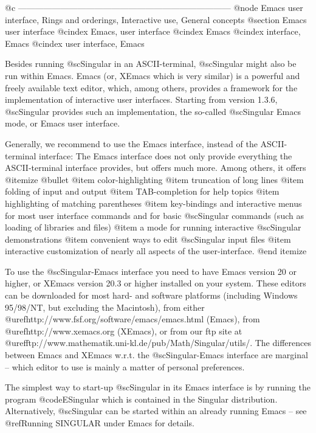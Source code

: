 @c ---------------------------------------------------------------------------
@node Emacs user interface, Rings and orderings, Interactive use, General concepts
@section Emacs user interface
@cindex Emacs, user interface
@cindex Emacs
@cindex interface, Emacs
@cindex user interface, Emacs

Besides running @sc{Singular} in an ASCII-terminal, @sc{Singular} might
also be run within Emacs. Emacs (or, XEmacs which is very similar) is a
powerful and freely available text editor, which, among others,
provides a framework for the implementation of interactive user
interfaces. Starting from version 1.3.6, @sc{Singular} provides such an
implementation, the so-called @sc{Singular} Emacs mode, or Emacs user
interface.

Generally, we recommend to use the Emacs interface,
instead of the ASCII-terminal interface: The Emacs interface does not
only provide everything the ASCII-terminal interface provides, but
offers much more. Among others, it offers
@itemize @bullet
@item
color-highlighting
@item
truncation of long lines
@item
folding of input and output
@item
TAB-completion for help topics
@item
highlighting of matching parentheses
@item
key-bindings and interactive menus for most user interface commands and
for basic @sc{Singular} commands (such as loading of libraries and files)
@item
a mode for running interactive @sc{Singular} demonstrations
@item
convenient ways to edit @sc{Singular} input files
@item
interactive customization of nearly all aspects of the user-interface.
@end itemize

To use the @sc{Singular}-Emacs interface you need to have Emacs version
20 or higher, or XEmacs
version 20.3 or higher installed on your system. These
editors can be downloaded for most hard- and software platforms
(including Windows
95/98/NT, but excluding the Macintosh), from either
@uref{http://www.fsf.org/software/emacs/emacs.html} (Emacs), from
@uref{http://www.xemacs.org} (XEmacs), or from our ftp site at
@uref{ftp://www.mathematik.uni-kl.de/pub/Math/Singular/utils/}. The
differences between Emacs and XEmacs w.r.t. the  @sc{Singular}-Emacs
interface are marginal -- which editor to use is mainly a matter of personal
preferences.

The simplest way to start-up @sc{Singular} in its Emacs interface is by
running the program @code{ESingular} which is contained in the Singular
distribution. Alternatively, @sc{Singular} can be started within an
already running Emacs -- see @ref{Running SINGULAR under Emacs} for
details.


